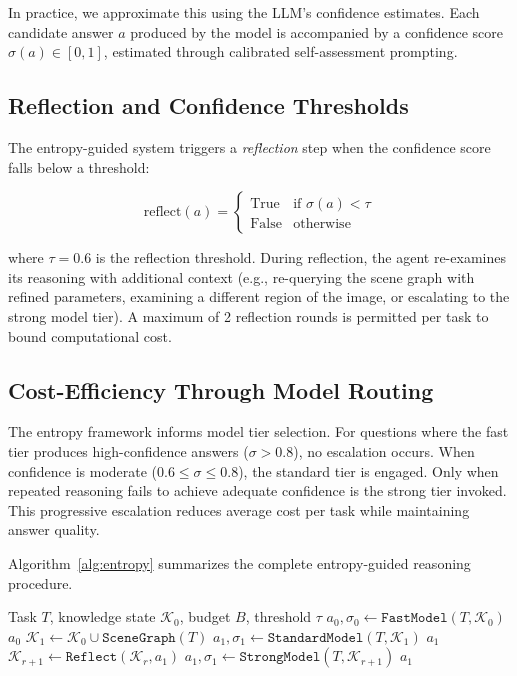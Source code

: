 \documentclass[11pt]{article}
\begin{document}
In practice, we approximate this using the LLM's confidence estimates. Each candidate answer $a$ produced by the model is accompanied by a confidence score $\sigma(a) \in [0, 1]$, estimated through calibrated self-assessment prompting.

\subsection{Reflection and Confidence Thresholds}

The entropy-guided system triggers a \emph{reflection} step when the confidence score falls below a threshold:

\begin{equation}
  \text{reflect}(a) = \begin{cases}
    \text{True}  & \text{if } \sigma(a) < \tau \\
    \text{False} & \text{otherwise}
  \end{cases}
  \label{eq:reflect}
\end{equation}

where $\tau = 0.6$ is the reflection threshold. During reflection, the agent re-examines its reasoning with additional context (e.g., re-querying the scene graph with refined parameters, examining a different region of the image, or escalating to the strong model tier). A maximum of 2 reflection rounds is permitted per task to bound computational cost.

\subsection{Cost-Efficiency Through Model Routing}

The entropy framework informs model tier selection. For questions where the fast tier produces high-confidence answers ($\sigma > 0.8$), no escalation occurs. When confidence is moderate ($0.6 \leq \sigma \leq 0.8$), the standard tier is engaged. Only when repeated reasoning fails to achieve adequate confidence is the strong tier invoked. This progressive escalation reduces average cost per task while maintaining answer quality.

Algorithm~\ref{alg:entropy} summarizes the complete entropy-guided reasoning procedure.

\begin{algorithm}[t]
\caption{Entropy-Guided Reasoning}
\label{alg:entropy}
\begin{algorithmic}[1]
\REQUIRE Task $T$, knowledge state $\mathcal{K}_0$, budget $B$, threshold $\tau$
\STATE $a_0, \sigma_0 \leftarrow \texttt{FastModel}(T, \mathcal{K}_0)$
  \RETURN $a_0$
\ENDIF
\STATE $\mathcal{K}_1 \leftarrow \mathcal{K}_0 \cup \texttt{SceneGraph}(T)$
\STATE $a_1, \sigma_1 \leftarrow \texttt{StandardModel}(T, \mathcal{K}_1)$
  \IF{$\sigma_1 \geq \tau$}
    \RETURN $a_1$
  \ENDIF
  \STATE $\mathcal{K}_{r+1} \leftarrow \texttt{Reflect}(\mathcal{K}_r, a_1)$
  \STATE $a_1, \sigma_1 \leftarrow \texttt{StrongModel}(T, \mathcal{K}_{r+1})$
\ENDFOR
\RETURN $a_1$
\end{algorithmic}
\end{algorithm}
\end{document}
